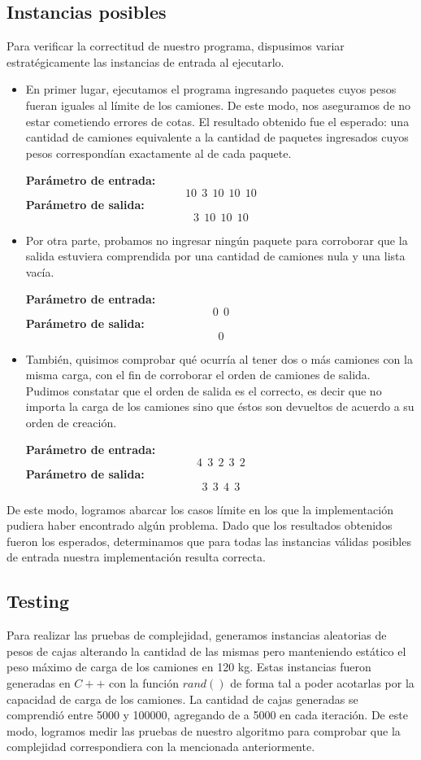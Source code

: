 \subsection{Instancias posibles}
Para verificar la correctitud de nuestro programa, dispusimos variar estratégicamente las instancias de entrada al ejecutarlo.
\begin{itemize}
\item En primer lugar, ejecutamos el programa ingresando paquetes cuyos pesos fueran iguales al límite de los camiones. De este modo, nos aseguramos de no estar cometiendo errores de cotas. El resultado obtenido fue el esperado: una cantidad de camiones equivalente a la cantidad de paquetes ingresados cuyos pesos correspondían exactamente al de cada paquete.\newline

\textbf{Parámetro de entrada:} $$10\ \ 3\ \ 10\ \ 10\ \ 10$$
\textbf{Parámetro de salida:} $$3\ \ 10\ \ 10\ \ 10$$
\item Por otra parte, probamos no ingresar ningún paquete para corroborar que la salida estuviera comprendida por una cantidad de camiones nula y una lista vacía.\newline

\textbf{Parámetro de entrada:} $$0\ \ 0$$
\textbf{Parámetro de salida:} $$0$$
\item También, quisimos comprobar qué ocurría al tener dos o más camiones con la misma carga, con el fin de corroborar el orden de camiones de salida. Pudimos constatar que el orden de salida es el correcto, es decir que no importa la carga de los camiones sino que éstos son devueltos de acuerdo a su orden de creación.\newline

\textbf{Parámetro de entrada:} $$4\ \ 3\ \ 2\ \ 3\ \ 2$$
\textbf{Parámetro de salida:} $$3\ \ 3\ \ 4\ \ 3$$
\end{itemize}

De este modo, logramos abarcar los casos límite en los que la implementación pudiera haber encontrado algún problema. Dado que los resultados obtenidos fueron los esperados, determinamos que para todas las instancias válidas posibles de entrada nuestra implementación resulta correcta.

\subsection{Testing}

Para realizar las pruebas de complejidad, generamos instancias aleatorias de pesos de cajas alterando la cantidad de las mismas pero manteniendo estático el peso máximo de carga de los camiones en 120 \unit{kg}. Estas instancias fueron generadas en $C++$ con la función $rand()$ de forma tal a poder acotarlas por la capacidad de carga de los camiones. La cantidad de cajas generadas se comprendió entre 5000 y 100000, agregando de a 5000 en cada iteración. De este modo, logramos medir las pruebas de nuestro algoritmo para comprobar que la complejidad correspondiera con la mencionada anteriormente.

